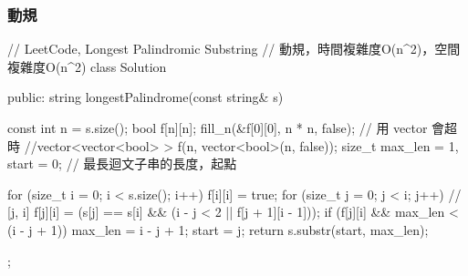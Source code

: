 \subsubsection{動規}
\begin{Code}
// LeetCode, Longest Palindromic Substring
// 動規，時間複雜度O(n^2)，空間複雜度O(n^2)
class Solution {
public:
    string longestPalindrome(const string& s) {
        const int n = s.size();
        bool f[n][n];
        fill_n(&f[0][0], n * n, false);
        // 用 vector 會超時
        //vector<vector<bool> > f(n, vector<bool>(n, false));
        size_t max_len = 1, start = 0;  // 最長迴文子串的長度，起點

        for (size_t i = 0; i < s.size(); i++) {
            f[i][i] = true;
            for (size_t j = 0; j < i; j++) {  // [j, i]
                f[j][i] = (s[j] == s[i] && (i - j < 2 || f[j + 1][i - 1]));
                if (f[j][i] && max_len < (i - j + 1)) {
                    max_len = i - j + 1;
                    start = j;
                }
            }
        }
        return s.substr(start, max_len);
    }
};
\end{Code}


